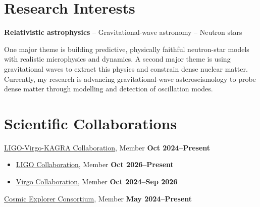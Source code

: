 \newcommand{\myname}{Fabian Gittins}




\begin{resume}

\thispagestyle{empty}



\section{Research Interests}

\textbf{Relativistic astrophysics} -- Gravitational-wave astronomy --
Neutron stars

One major theme is building predictive, physically faithful neutron-star models
with realistic microphysics and dynamics.
A second major theme is using gravitational waves to extract this physics and
constrain dense nuclear matter.
Currently, my research is advancing gravitational-wave asteroseismology to
probe dense matter through modelling and detection of oscillation modes.













\section{Scientific Collaborations}

\href{https://www.ligo.caltech.edu/page/ligo-scientific-collaboration}
{LIGO-Virgo-KAGRA Collaboration}, Member
\hfill \textbf{Oct 2024--Present}%
%
\vspace*{0.05in}
\begin{itemize}
    \item[]
    \href{https://ligo.org/}{LIGO Collaboration}, Member
    \hfill \textbf{Oct 2026--Present}
    \item[]
    \href{https://www.virgo-gw.eu/}{Virgo Collaboration}, Member
    \hfill \textbf{Oct 2024--Sep 2026}
\end{itemize}

\href{https://cosmicexplorer.org/}{Cosmic Explorer Consortium}, Member
\hfill \textbf{May 2024--Present}


\end{resume}

